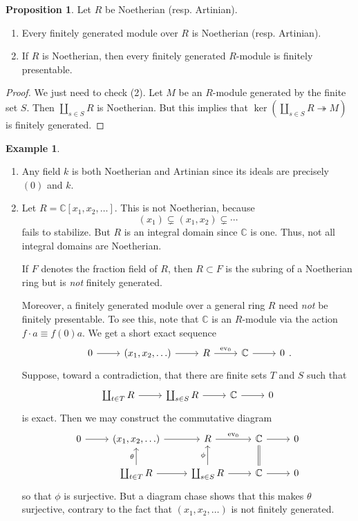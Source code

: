 \documentclass[10pt,letterpaper,cm]{nupset}
\theoremstyle{definition}
\newtheorem{exmp}[definition]{Example}
\theoremstyle{theorem}
\newtheorem{prop}[definition]{Proposition}
\theoremstyle{remark}
\newcommand{\C}{\mathbb C}
\newcommand{\1}{\mathbf{1}}
\newcommand{\0}{\vec 0}
\begin{document}
\begin{prop} Let $R$ be Noetherian (resp. Artinian).
\begin{enumerate}[label=(\arabic*)]
\item Every finitely generated module over $R$ is Noetherian (resp. Artinian).
\item If $R$ is Noetherian, then every finitely generated $R$-module is finitely presentable. 
\end{enumerate}
\end{prop}
\begin{proof}
We just need to check (2). Let $M$ be an $R$-module generated by the finite set $S$. Then  $\coprod_{s\in S} R$  is Noetherian. But this implies that $\ker(\coprod_{s\in S} R \twoheadrightarrow M)$ is finitely generated.
\end{proof}

\begin{exmp} $ $
\begin{enumerate}
\item Any field $k$ is both Noetherian and Artinian since its ideals are precisely $(0)$ and $k$.
\item Let $R= \C[x_1, x_2, \ldots]$. This is not Noetherian, because $$(x_1) \subsetneq (x_1, x_2) \subsetneq \cdots   $$ fails to stabilize. But $R$ is an integral domain since $\C$ is one. Thus, not all integral domains are Noetherian.

 If $F$ denotes the fraction field of $R$, then $R\subset F$ is the subring of a Noetherian ring but is \emph{not} finitely generated. 

Moreover, a finitely generated module over a general ring $R$ need \emph{not} be finitely presentable. To see this, note that $\C$ is an $R$-module via the action $f \cdot a \equiv f(0)a$. We get a short exact sequence
\[
\begin{tikzcd}
0 \arrow[r] & {(x_1, x_2, \ldots)} \arrow[r] & R \arrow[r, "\text{ev}_0"] & \C \arrow[r] & 0
\end{tikzcd}
.\]
Suppose, toward a contradiction, that there are finite sets $T$ and $S$ such that 
\[ 
\begin{tikzcd}
 \coprod_{t\in T}R \arrow[r] & \coprod_{s\in S} R \arrow[r] & \C \arrow[r]  & 0
\end{tikzcd} 
\]  is  exact. 
Then we may construct the commutative diagram
\[
\begin{tikzcd}
0 \arrow[r] & {(x_1, x_2, \ldots)} \arrow[r] & R \arrow[r, "\text{ev}_0"] & \C \arrow[r] & 0 \\
 & \coprod_{t\in T}R \arrow[r] \arrow[u, "\theta"] & \coprod_{s\in S} R \arrow[r] \arrow[u, "\phi"] & \C \arrow[r] \arrow[u, equal] & 0
\end{tikzcd}
\] so that $\phi$ is surjective. But a diagram chase shows that this makes $\theta$ surjective, contrary to the fact that $\left(x_1, x_2, \ldots\right)$ is not finitely generated.
\end{enumerate}
\end{exmp}
\end{document}
